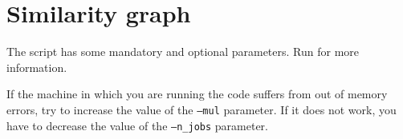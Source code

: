 \inputminted{Python}{../code/data-preparation.py}

\pagebreak
\section{Similarity graph} \label{simgra}
The script has some mandatory and optional parameters.
Run  for more information.

If the machine in which you are running the code suffers from out of memory errors,
try to increase the value of the \texttt{--mul} parameter.
If it does not work, you have to decrease the value of the \texttt{--n\_jobs} parameter.

\inputminted{Python}{../code/similarity_graph.py}